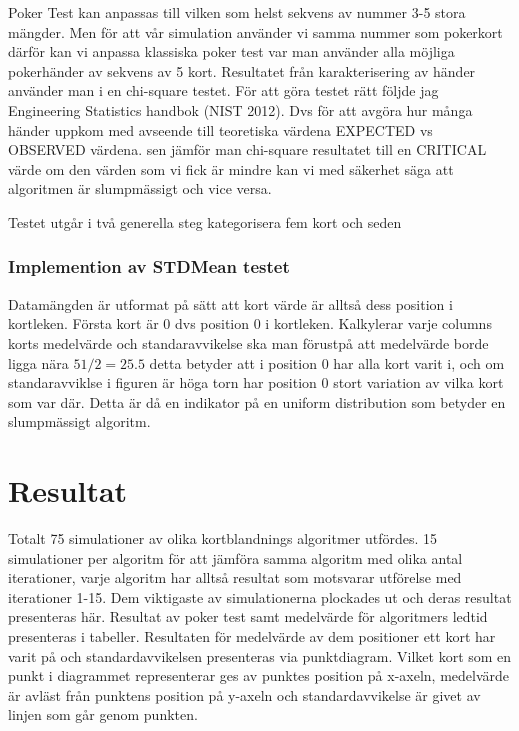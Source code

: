 \documentclass[swedish,a4paper]{article}
\begin{document}
Poker Test kan anpassas till vilken som helst sekvens av nummer 3-5 stora
mängder. Men för att vår simulation använder vi samma nummer som pokerkort
därför kan vi anpassa klassiska poker test var man använder alla möjliga
pokerhänder av sekvens av 5 kort. Resultatet från karakterisering av händer
använder man i en chi-square testet. För att göra testet rätt följde jag
Engineering Statistics handbok (NIST 2012). Dvs för att avgöra hur många 
händer
uppkom med avseende till teoretiska värdena EXPECTED vs OBSERVED värdena. sen
jämför man chi-square resultatet till en CRITICAL värde om den värden som vi
fick är mindre kan vi med säkerhet säga att algoritmen är slumpmässigt och 
vice versa.

Testet utgår i två generella steg kategorisera fem kort och seden 

\subsubsection{Implemention av STDMean testet}
Datamängden är utformat på sätt att kort värde är alltså dess position i
kortleken. Första kort är 0 dvs position 0 i kortleken. Kalkylerar varje
columns korts medelvärde och standaravvikelse ska man förustpå att medelvärde
borde ligga nära $51/2= 25.5$ detta betyder att i position 0 har alla kort varit
i, och om standaravviklse i figuren är höga torn har position 0 stort variation
av vilka kort som var där. Detta är då en indikator på en uniform distribution
som betyder en slumpmässigt algoritm.

\section{Resultat}


Totalt 75 simulationer av olika kortblandnings algoritmer utfördes. 15
simulationer per algoritm för att jämföra samma algoritm med olika antal
iterationer, varje algoritm har alltså resultat som motsvarar utförelse
med iterationer 1-15. Dem viktigaste av simulationerna plockades ut och
deras resultat presenteras här. Resultat av poker test samt medelvärde
för algoritmers ledtid presenteras i tabeller. Resultaten för medelvärde
av dem positioner ett kort har varit på och standardavvikelsen
presenteras via punktdiagram. Vilket kort som en punkt i diagrammet
representerar ges av punktes position på x-axeln, medelvärde är avläst
från punktens position på y-axeln och standardavvikelse är givet av
linjen som går genom punkten. 
\end{document}

